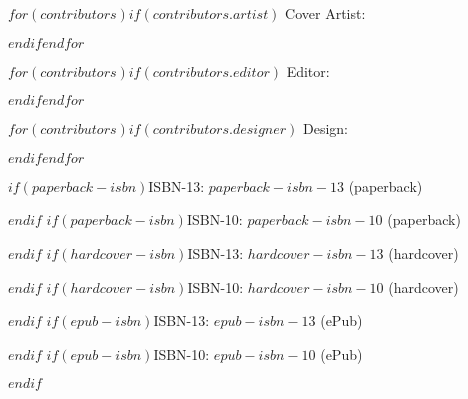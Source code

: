     \begin{center}

      $for(contributors)$$if(contributors.artist)$ Cover Artist: \artist \par$endif$$endfor$
      
      $for(contributors)$$if(contributors.editor)$ Editor: \editor \par$endif$$endfor$
      
      $for(contributors)$$if(contributors.designer)$ Design: \designer \par$endif$$endfor$
   
      \vspace{0.4cm}
      
  $if(paperback-isbn)$\noindent ISBN-13: {$paperback-isbn-13$} (paperback) \par $endif$
  $if(paperback-isbn)$\noindent ISBN-10: {$paperback-isbn-10$} (paperback) \par $endif$
  $if(hardcover-isbn)$\noindent ISBN-13: {$hardcover-isbn-13$} (hardcover) \par $endif$
  $if(hardcover-isbn)$\noindent ISBN-10: {$hardcover-isbn-10$} (hardcover) \par $endif$
  $if(epub-isbn)$\noindent ISBN-13: {$epub-isbn-13$} (ePub) \par $endif$
  $if(epub-isbn)$\noindent ISBN-10: {$epub-isbn-10$} (ePub) \par $endif$
      
    \end{center}
    
\clearpage